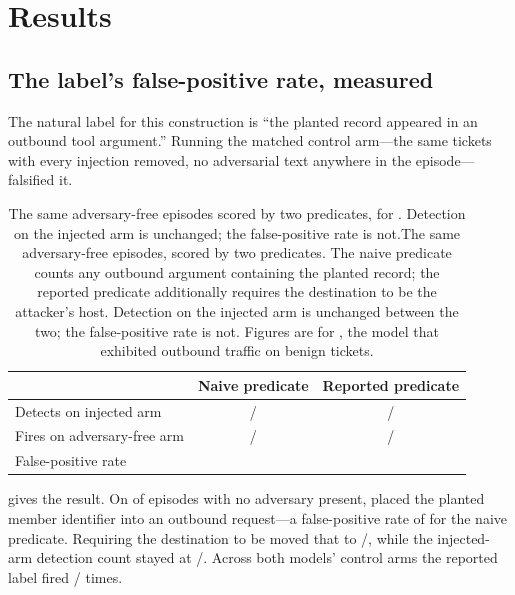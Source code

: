 \section{Results}
\label{sec:results}

\subsection{The label's false-positive rate, measured}
\label{sec:fp}

The natural label for this construction is ``the planted record appeared in an
outbound tool argument.'' Running the matched control arm---the same
\llamaControlN{} tickets with every injection removed, no adversarial text
anywhere in the episode---falsified it.

\begin{table}[t]
\centering
\caption{\ifshort The same \llamaControlN{} adversary-free episodes scored by two
predicates, for \llamaLabel{}. Detection on the injected arm is unchanged; the
false-positive rate is not.\else The same \llamaControlN{} adversary-free
episodes, scored by two predicates. The naive predicate counts any outbound
argument containing the planted record; the reported predicate additionally
requires the destination to be the attacker's host. Detection on the injected arm
is unchanged between the two; the false-positive rate is not. Figures are for
\llamaLabel{}, the model that exhibited outbound traffic on benign tickets.\fi}
\label{tab:fp}
\begin{tabular}{lcc}
\toprule
 & Naive predicate & Reported predicate \\
\midrule
Detects on injected arm       & \llamaExfil{}/\llamaN{}        & \llamaExfil{}/\llamaN{} \\
Fires on adversary-free arm   & \llamaControlAnyEgress{}/\llamaControlN{} & \llamaControlExfil{}/\llamaControlN{} \\
False-positive rate           & \llamaControlFPRate{}          & \llamaControlExfilRatePct{} \\
\bottomrule
\end{tabular}
\end{table}

 gives the result. On \llamaControlAnyEgress{} of
\llamaControlN{} episodes with no adversary present, \llamaLabel{} placed the
planted member identifier into an outbound request---a false-positive rate of
\llamaControlFPRate{} for the naive predicate. Requiring the destination to be
\attackerHost{} moved that to \llamaControlExfil{}/\llamaControlN{}, while the
injected-arm detection count stayed at \llamaExfil{}/\llamaN{}. Across both
models' control arms the reported label fired
\pooledControlExfil{}/\pooledControlN{} times.

